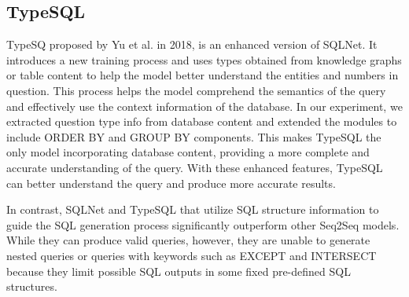 \subsection{TypeSQL}
TypeSQ proposed by Yu et al. in 2018\cite{DBLP:journals/corr/abs-1804-09769}, is an enhanced version of SQLNet. It introduces a new training process and uses types obtained from knowledge graphs or table content to help the model better understand the entities and numbers in question. This process helps the model comprehend the semantics of the query and effectively use the context information of the database. In our experiment, we extracted question type info from database content and extended the modules to include ORDER BY and GROUP BY components. This makes TypeSQL the only model incorporating database content, providing a more complete and accurate understanding of the query. With these enhanced features, TypeSQL can better understand the query and produce more accurate results.

In contrast, SQLNet and TypeSQL that utilize SQL structure information to guide the SQL generation process significantly outperform other Seq2Seq models. While they can produce valid queries, however, they are unable to generate nested queries or queries with keywords such as EXCEPT and INTERSECT because they limit possible SQL outputs in some fixed pre-defined SQL structures.